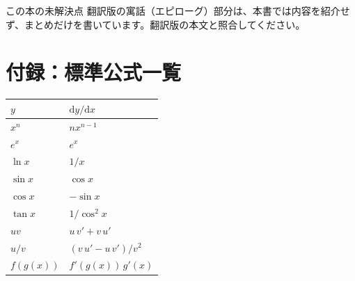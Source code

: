 \documentclass[a4paper,11pt,openany]{ltjsbook}
\newcommand{\dd}{\mathrm{d}}
\begin{document}
\begin{notebox}{この本の未解決点}
翻訳版の寓話（エピローグ）部分は、本書では内容を紹介せず、まとめだけを書いています。翻訳版の本文と照合してください。
\end{notebox}

\chapter*{付録：標準公式一覧}

\begin{center}
\renewcommand{\arraystretch}{1.4}
\begin{tabular}{ll}
\toprule
$y$ & $\dd y/\dd x$ \\
\midrule
$x^n$ & $nx^{n-1}$\\
$e^x$ & $e^x$\\
$\ln x$ & $1/x$\\
$\sin x$ & $\cos x$\\
$\cos x$ & $-\sin x$\\
$\tan x$ & $1/\cos^2x$\\
$uv$ & $u\,v'+v\,u'$\\
$u/v$ & $(v\,u'-u\,v')/v^2$\\
$f(g(x))$ & $f'(g(x))\,g'(x)$\\
\bottomrule
\end{tabular}
\end{center}
\end{document}
